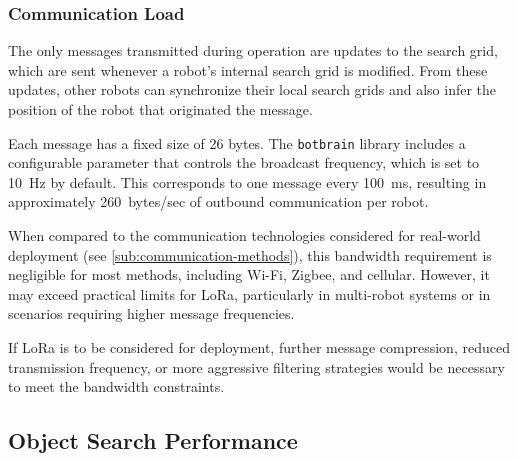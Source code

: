 \subsubsection{Communication {\color{red}Load}}
The only messages transmitted during operation are updates to the search grid, which are sent whenever a robot’s internal search grid is modified. From these updates, other robots can synchronize their local search grids and also infer the position of the robot that originated the message.

Each message has a fixed size of 26 bytes. The \texttt{botbrain} library includes a configurable parameter that controls the broadcast frequency, which is set to \SI{10}{Hz} by default. This corresponds to one message every \SI{100}{ms}, resulting in approximately \SI{260}{bytes/sec} of outbound communication per robot.

When compared to the communication technologies considered for real-world deployment (see \cref{sub:communication-methods}), this bandwidth requirement is negligible for most methods, including Wi-Fi, Zigbee, and cellular. However, it may exceed practical limits for LoRa, particularly in multi-robot systems or in scenarios requiring higher message frequencies.

If LoRa is to be considered for deployment, further message compression, reduced transmission frequency, or more aggressive filtering strategies would be necessary to meet the bandwidth constraints.


\subsection{Object Search Performance}


